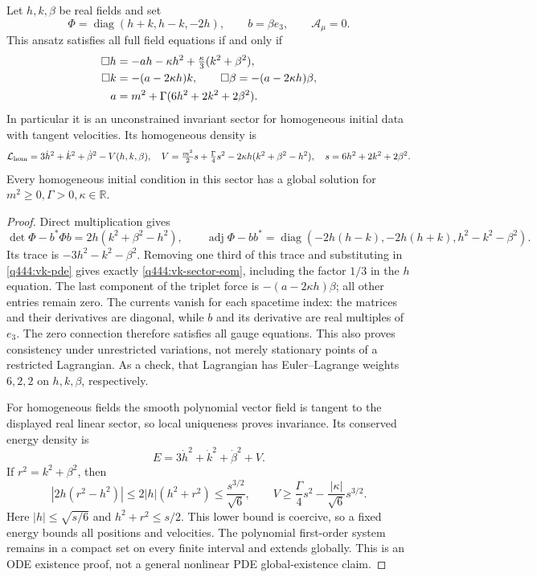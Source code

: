 \begin{proposition}
\label{q444:vk-sector}
Let \(h,k,\beta\) be real fields and set
\[
 \Phi=\operatorname{diag}(h+k,h-k,-2h),\qquad b=\beta e_3,
 \qquad\mathcal A_\mu=0.
\]
This ansatz satisfies all full field equations if and only if
\begin{align}
 \Box h&=-ah-\kappa h^2+\tfrac{\kappa}{3}(k^2+\beta^2),\notag\\
 \Box k&=-(a-2\kappa h)k,\qquad
 \Box\beta=-(a-2\kappa h)\beta,\label{q444:vk-sector-eom}\\
 a&=m^2+\Gamma(6h^2+2k^2+2\beta^2).\notag
\end{align}
In particular it is an unconstrained invariant sector for homogeneous
initial data with tangent velocities. Its homogeneous density is
\[
 \mathcal L_{\rm hom}=3\dot h^2+\dot k^2+\dot\beta^2-V(h,k,\beta),
 \quad
 V=\tfrac{m^2}{2}s+\tfrac{\Gamma}{4}s^2
                    -2\kappa h(k^2+\beta^2-h^2),
 \quad s=6h^2+2k^2+2\beta^2 .
\]
Every homogeneous initial condition in this sector has a global
solution for \(m^2\geq0,\Gamma>0,\kappa\in\mathbb R\).
\end{proposition}
\begin{proof}
Direct multiplication gives
\[
 \det\Phi-b^*\Phi b=2h(k^2+\beta^2-h^2),\qquad
 \operatorname{adj}\Phi-bb^*
 =\operatorname{diag}(-2h(h-k),-2h(h+k),h^2-k^2-\beta^2).
\]
Its trace is \(-3h^2-k^2-\beta^2\). Removing one third of this trace
and substituting in \eqref{q444:vk-pde} gives exactly
\eqref{q444:vk-sector-eom}, including the factor \(1/3\) in the
\(h\) equation. The last component of the triplet force is
\(-(a-2\kappa h)\beta\); all other entries remain zero.
The currents vanish for each spacetime index: the matrices and
their derivatives are diagonal, while \(b\) and its derivative
are real multiples of \(e_3\). The zero connection therefore
satisfies all gauge equations. This also proves consistency
under unrestricted variations, not merely stationary points
of a restricted Lagrangian. As a check, that Lagrangian has
Euler--Lagrange weights \(6,2,2\) on \(h,k,\beta\), respectively.

For homogeneous fields the smooth polynomial vector field is tangent
to the displayed real linear sector, so local uniqueness proves
invariance. Its conserved energy density is
\[
 E=3\dot h^2+\dot k^2+\dot\beta^2+V.
\]
If \(r^2=k^2+\beta^2\), then
\[
 |2h(r^2-h^2)|\leq2|h|(h^2+r^2)
 \leq \frac{s^{3/2}}{\sqrt6},\qquad
 V\geq\frac{\Gamma}{4}s^2-\frac{|\kappa|}{\sqrt6}s^{3/2}.
\]
Here \(|h|\leq\sqrt{s/6}\) and \(h^2+r^2\leq s/2\).
This lower bound is coercive, so a fixed energy bounds all positions
and velocities. The polynomial first-order system remains in a
compact set on every finite interval and extends globally.
This is an ODE existence proof, not a general nonlinear PDE
global-existence claim.
\end{proof}

